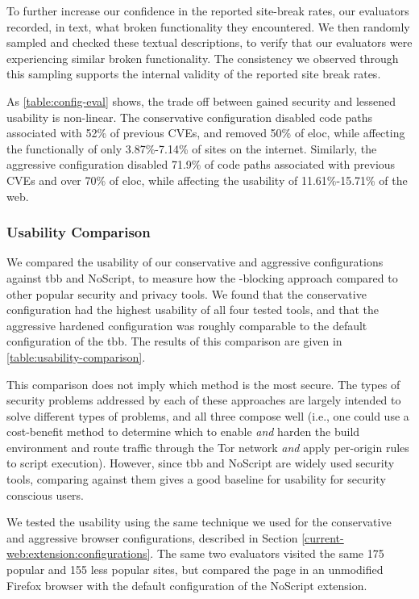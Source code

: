 To further increase our confidence in the reported site-break rates, our
evaluators recorded, in text, what broken functionality they encountered.  We
then randomly sampled and checked these textual descriptions, to verify that
our evaluators were experiencing similar broken functionality.  The consistency
we observed through this sampling supports the internal validity of the
reported site break rates.

As \ref{table:config-eval} shows, the trade off between gained security and
lessened usability is non-linear.  The conservative configuration disabled code
paths associated with 52\% of previous CVEs, and removed 50\% of \gls{eloc},
while affecting the functionally of only 3.87\%-7.14\% of sites on the
internet.  Similarly, the aggressive configuration disabled 71.9\% of code
paths associated with previous CVEs and over 70\% of \gls{eloc}, while
affecting the usability of 11.61\%-15.71\% of the web.


\subsubsection{Usability Comparison}
\label{current-web:extension:usability-comparison}


We compared the usability of our conservative and aggressive configurations
against \gls{tbb} and NoScript, to measure how the \WAPI-blocking approach
compared to other popular security and privacy tools.  We found that the
conservative configuration had the highest usability of all four tested tools,
and that the aggressive hardened configuration was roughly comparable to the
default configuration of the \gls{tbb}.  The results of this comparison are
given in \ref{table:usability-comparison}.

This comparison does not imply which method is the most secure.  The types of
security problems addressed by each of these approaches are largely intended to
solve different types of problems, and all three compose well (i.e., one could
use a cost-benefit method to determine which \WASs to enable \textit{and}
harden the build environment and route traffic through the Tor network
\textit{and} apply per-origin rules to script execution). However, since
\gls{tbb} and NoScript are widely used security tools, comparing against them
gives a good baseline for usability for security conscious users.

We tested the usability using the same technique we used for the conservative
and aggressive browser configurations, described in Section
\ref{current-web:extension:configurations}. The same two evaluators visited the
same 175 popular and 155 less popular sites, but compared the page in
an unmodified Firefox browser with the default configuration of the NoScript
extension.

